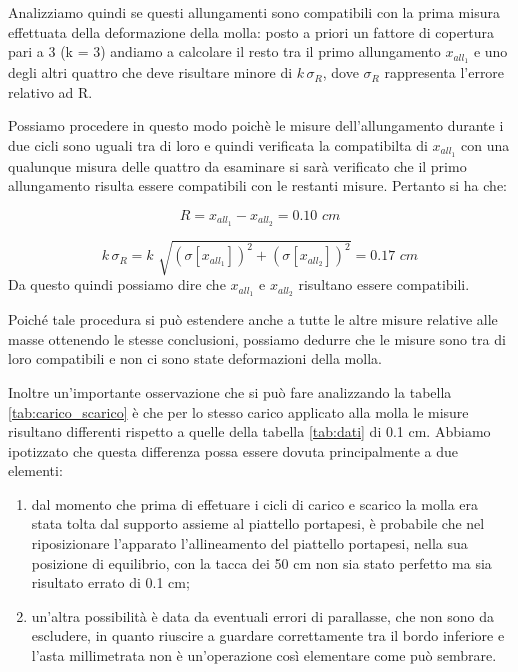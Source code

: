Analizziamo quindi se questi allungamenti sono compatibili con la prima misura effettuata della deformazione della molla: posto a priori un fattore di copertura pari a 3 (k = 3) andiamo a calcolare il resto tra il primo allungamento $x_{all_1}$ e uno degli altri quattro che deve risultare minore di $k \, \sigma_R$, dove $\sigma_R$ rappresenta l'errore relativo ad R.

Possiamo procedere in questo modo poichè le misure dell'allungamento durante i due cicli sono uguali tra di loro e quindi verificata la compatibilta di  $x_{all_1}$ con una qualunque misura delle quattro da esaminare si sarà verificato che il primo allungamento risulta essere compatibili con le restanti misure. Pertanto si ha che:

\begin{equation*}
	R = x_{all_1} - x_{all_2} = 0.10 \,\,cm
\end{equation*}

\begin{equation*}
	k\, \sigma_{R} = k\,\, \sqrt{(\sigma[x_{all_1}])^2 + (\sigma[x_{all_2}])^2} = 0.17 \,\,cm
\end{equation*}
%
Da questo quindi possiamo dire che $x_{all_1}$ e $x_{all_2}$ risultano essere compatibili.

Poiché tale procedura si può estendere anche a tutte le altre misure relative alle masse ottenendo le stesse conclusioni, possiamo dedurre che le misure sono tra di loro compatibili e non ci sono state deformazioni della molla.

Inoltre un'importante osservazione che si può fare analizzando la tabella \ref{tab:carico_scarico} è che per lo stesso carico applicato alla molla le misure risultano differenti rispetto a quelle della tabella \ref{tab:dati} di 0.1 cm. Abbiamo ipotizzato che questa differenza possa essere dovuta principalmente a due elementi:

\begin{enumerate}
	\item{dal momento che prima di effetuare i cicli di carico e scarico la molla era stata tolta dal supporto assieme al piattello portapesi, è probabile che nel riposizionare l'apparato l'allineamento del piattello portapesi, nella sua posizione di equilibrio, con la tacca dei 50 cm non sia stato perfetto ma sia risultato errato di 0.1 cm;}
	\item{un'altra possibilità è data da eventuali errori di parallasse, che non sono da escludere, in quanto riuscire a guardare correttamente tra il bordo inferiore e l'asta millimetrata non è un'operazione così elementare come può sembrare.}
\end{enumerate}

